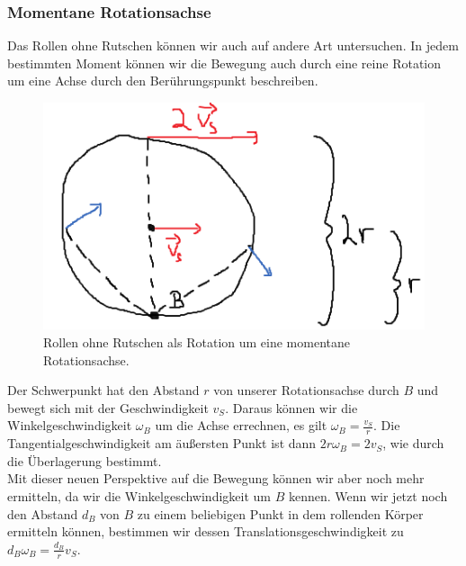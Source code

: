 \documentclass[11pt]{article}
\begin{document}
\subsubsection{Momentane Rotationsachse}
Das Rollen ohne Rutschen können wir auch auf andere Art untersuchen. In jedem bestimmten Moment können wir die Bewegung auch durch eine reine Rotation um eine Achse durch den Berührungspunkt beschreiben. 
\begin{figure}[H]
        \centering
        \includegraphics{abb/5-komb-rot-tra-rollen-ohne-rutschen/momentane-rot-achse.png}
        \caption{Rollen ohne Rutschen als Rotation um eine momentane Rotationsachse.}
\end{figure}
Der Schwerpunkt hat den Abstand $r$ von unserer Rotationsachse durch $B$ und bewegt sich mit der Geschwindigkeit $v_S$. Daraus können wir die Winkelgeschwindigkeit $\omega_B$ um die Achse errechnen, es gilt $\displaystyle\omega_B = \frac{v_S}{r}$. Die Tangentialgeschwindigkeit am äußersten Punkt ist dann $2r\omega_B = 2v_S$, wie durch die Überlagerung bestimmt. \\
Mit dieser neuen Perspektive auf die Bewegung können wir aber noch mehr ermitteln, da wir die Winkelgeschwindigkeit um $B$ kennen. Wenn wir jetzt noch den Abstand $d_B$ von $B$ zu einem beliebigen Punkt in dem rollenden Körper ermitteln können, bestimmen wir dessen Translationsgeschwindigkeit zu $\displaystyle d_B\omega_B = \frac{d_B}{r}v_S$.
\end{document}
